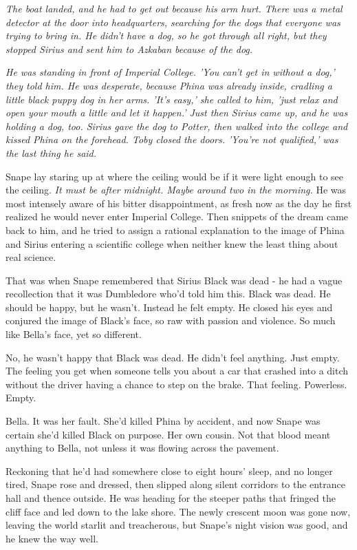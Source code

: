 \documentclass[a4paper,11pt]{article}
\begin{document}
\emph{The boat landed, and he had to get out because his arm hurt. There was a metal detector at the door into headquarters, searching for the dogs that everyone was trying to bring in. He didn't have a dog, so he got through all right, but they stopped Sirius and sent him to Azkaban because of the dog.}

\emph{He was standing in front of Imperial College. 'You can't get in without a dog,' they told him. He was desperate, because Phina was already inside, cradling a little black puppy dog in her arms. 'It's easy,' she called to him, 'just relax and open your mouth a little and let it happen.' Just then Sirius came up, and he was holding a dog, too. Sirius gave the dog to Potter, then walked into the college and kissed Phina on the forehead. Toby closed the doors. 'You're not qualified,' was the last thing he said.}

Snape lay staring up at where the ceiling would be if it were light enough to see the ceiling. \emph{It must be after midnight. Maybe around two in the morning.} He was most intensely aware of his bitter disappointment, as fresh now as the day he first realized he would never enter Imperial College. Then snippets of the dream came back to him, and he tried to assign a rational explanation to the image of Phina and Sirius entering a scientific college when neither knew the least thing about real science.

That was when Snape remembered that Sirius Black was dead - he had a vague recollection that it was Dumbledore who'd told him this. Black was dead. He should be happy, but he wasn't. Instead he felt empty. He closed his eyes and conjured the image of Black's face, so raw with passion and violence. So much like Bella's face, yet so different.

No, he wasn't happy that Black was dead. He didn't feel anything. Just empty. The feeling you get when someone tells you about a car that crashed into a ditch without the driver having a chance to step on the brake. That feeling. Powerless. Empty.

Bella. It was her fault. She'd killed Phina by accident, and now Snape was certain she'd killed Black on purpose. Her own cousin. Not that blood meant anything to Bella, not unless it was flowing across the pavement.

Reckoning that he'd had somewhere close to eight hours' sleep, and no longer tired, Snape rose and dressed, then slipped along silent corridors to the entrance hall and thence outside. He was heading for the steeper paths that fringed the cliff face and led down to the lake shore. The newly crescent moon was gone now, leaving the world starlit and treacherous, but Snape's night vision was good, and he knew the way well.
\end{document}
